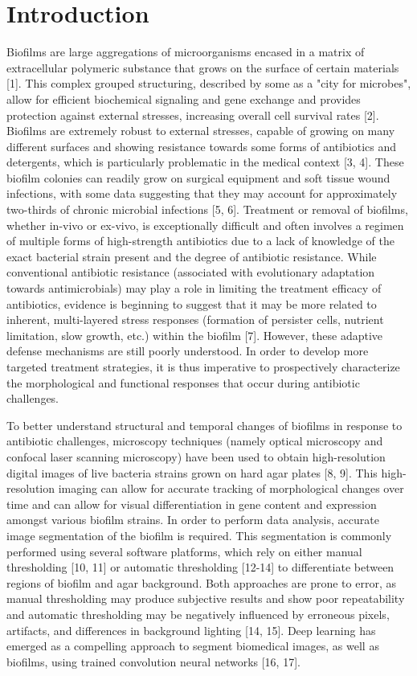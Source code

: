\documentclass[conference]{IEEEtran}
\begin{document}
\section{Introduction}
\label{secName}
Biofilms are large aggregations of microorganisms encased in a matrix of extracellular polymeric substance that grows on the surface of certain materials [1]. This complex grouped structuring, described by some as a "city for microbes", allow for efficient biochemical signaling and gene exchange and provides protection against external stresses, increasing overall cell survival rates [2]. Biofilms are extremely robust to external stresses, capable of growing on many different surfaces and showing resistance towards some forms of antibiotics and detergents, which is particularly problematic in the medical context [3, 4]. These biofilm colonies can readily grow on surgical equipment and soft tissue wound infections, with some data suggesting that they may account for approximately two-thirds of chronic microbial infections [5, 6]. Treatment or removal of biofilms, whether in-vivo or ex-vivo, is exceptionally difficult and often involves a regimen of multiple forms of high-strength antibiotics due to a lack of knowledge of the exact bacterial strain present and the degree of antibiotic resistance. While conventional antibiotic resistance (associated with evolutionary adaptation towards antimicrobials) may play a role in limiting the treatment efficacy of antibiotics, evidence is beginning to suggest that it may be more related to inherent, multi-layered stress responses (formation of persister cells, nutrient limitation, slow growth, etc.) within the biofilm [7]. However, these adaptive defense mechanisms are still poorly understood. In order to develop more targeted treatment strategies, it is thus imperative to prospectively characterize the morphological and functional responses that occur during antibiotic challenges. 

To better understand structural and temporal changes of biofilms in response to antibiotic challenges, microscopy techniques (namely optical microscopy and confocal laser scanning microscopy) have been used to obtain high-resolution digital images of live bacteria strains grown on hard agar plates [8, 9]. This high-resolution imaging can allow for accurate tracking of morphological changes over time and can allow for visual differentiation in gene content and expression amongst various biofilm strains. In order to perform data analysis, accurate image segmentation of the biofilm is required. This segmentation is commonly performed using several software platforms, which rely on either manual thresholding [10, 11] or automatic thresholding [12-14] to differentiate between regions of biofilm and agar background. Both approaches are prone to error, as manual thresholding may produce subjective results and show poor repeatability and automatic thresholding may be negatively influenced by erroneous pixels, artifacts, and differences in background lighting [14, 15]. Deep learning has emerged as a compelling approach to segment biomedical images, as well as biofilms, using trained convolution neural networks [16, 17].
\end{document}
